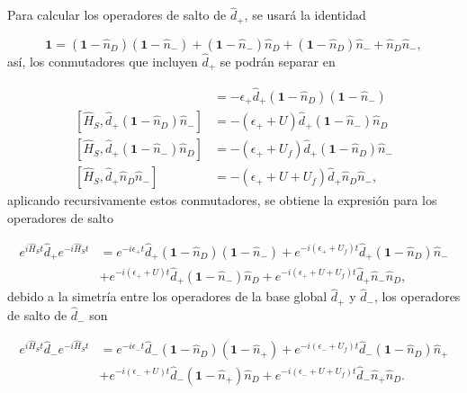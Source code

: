 \begin{appendixs}
Para calcular los operadores de salto de $\hat{d}_{+}$, se usará la identidad 

\begin{equation*}
    \textbf{1} = (\textbf{1}-\hat{n}_{D})(\textbf{1}-\hat{n}_{-}) + (\textbf{1}-\hat{n}_{-})\hat{n}_{D} + (\textbf{1}-\hat{n}_{D})\hat{n}_{-} + \hat{n}_{D}\hat{n}_{-},
\end{equation*}
así, los conmutadores que incluyen $\hat{d}_{+}$ se podrán separar en 

\begin{align*}
    [\hat{H}_{S},\hat{d}_{+}(\textbf{1}-\hat{n}_{D})(\textbf{1} - \hat{n}_{-})] & = - \epsilon_{+}\hat{d}_{+}(\textbf{1}-\hat{n}_{D})(\textbf{1} - \hat{n}_{-}) \\
    [\hat{H}_{S},\hat{d}_{+}(\textbf{1}-\hat{n}_{D})\hat{n}_{-}] & = - (\epsilon_{+} + U)\hat{d}_{+}(\textbf{1} - \hat{n}_{-})\hat{n}_{D} \\
    [\hat{H}_{S},\hat{d}_{+}(\textbf{1}-\hat{n}_{-})\hat{n}_{D}] & = - (\epsilon_{+} + U_{f})\hat{d}_{+}(\textbf{1} - \hat{n}_{D})\hat{n}_{-} \\
    [\hat{H}_{S},\hat{d}_{+}\hat{n}_{D}\hat{n}_{-}] & = - (\epsilon_{+} + U + U_{f})\hat{d}_{+}\hat{n}_{D}\hat{n}_{-}, 
\end{align*}
aplicando recursivamente estos conmutadores, se obtiene la expresión para los operadores de salto 

\begin{align*}
    e^{i \hat{H}_{S}t}\hat{d}_{+}e^{-i\hat{H}_{S}t} & = e^{-i\epsilon_{+}t}\hat{d}_{+}(\textbf{1}-\hat{n}_{D})(\textbf{1}-\hat{n}_{-}) + e^{-i(\epsilon_{+}+U_{f})t} \hat{d}_{+}(\textbf{1}-\hat{n}_{D})\hat{n}_{-} \\
    & + e^{-i(\epsilon_{+}+U)t}\hat{d}_{+}(\textbf{1}-\hat{n}_{-})\hat{n}_{D} + e^{-i(\epsilon_{+}+U+U_{f})t}\hat{d}_{+}\hat{n}_{-}\hat{n}_{D},
\end{align*}
debido a la simetría entre los operadores de la base global $\hat{d}_{+}$ y $\hat{d}_{-}$, los operadores de salto de $\hat{d}_{-}$ son

\begin{align*}
    e^{i \hat{H}_{S}t}\hat{d}_{-}e^{-i\hat{H}_{S}t} & = e^{-i\epsilon_{-}t}\hat{d}_{-}(\textbf{1}-\hat{n}_{D})(\textbf{1}-\hat{n}_{+}) + e^{-i(\epsilon_{-}+U_{f})t} \hat{d}_{-}(\textbf{1}-\hat{n}_{D})\hat{n}_{+} \\
    & + e^{-i(\epsilon_{-}+U)t}\hat{d}_{-}(\textbf{1}-\hat{n}_{+})\hat{n}_{D} + e^{-i(\epsilon_{-}+U+U_{f})t}\hat{d}_{-}\hat{n}_{+}\hat{n}_{D}.
\end{align*}


\end{appendixs}

